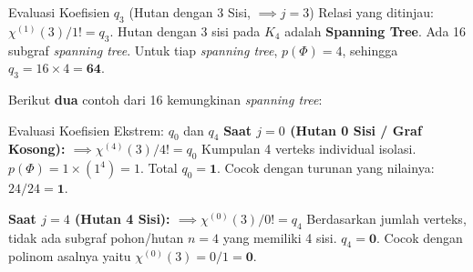 ﻿\documentclass[aspectratio=169]{beamer}
\begin{document}
\begin{frame}[fragile]{Evaluasi Koefisien $q_3$ (Hutan dengan 3 Sisi, $\implies j = 3$)}
  Relasi yang ditinjau: $\chi^{(1)}(3) / 1! = q_3$.
  Hutan dengan 3 sisi pada $K_4$ adalah \textbf{Spanning Tree}. Ada 16 subgraf \textit{spanning tree}.
  Untuk tiap \textit{spanning tree}, $p(\Phi) = 4$, sehingga $q_3 = 16 \times 4 = \mathbf{64}$.

  Berikut \textbf{dua} contoh dari 16 kemungkinan \textit{spanning tree}:

  \vspace{0.4cm}
  \begin{center}
  \end{center}
\end{frame}

\begin{frame}[fragile]{Evaluasi Koefisien Ekstrem: $q_0$ dan $q_4$}
  \textbf{Saat $j=0$ (Hutan 0 Sisi / Graf Kosong): $\implies \chi^{(4)}(3) / 4! = q_0$}
  Kumpulan 4 verteks individual isolasi.  $p(\Phi) = 1 \times (1^4) = 1$. Total $q_0 = \mathbf{1}$.
  Cocok dengan turunan yang nilainya: $24 / 24 = \mathbf{1}$.

  \vspace{0.4cm}
  \textbf{Saat $j=4$ (Hutan 4 Sisi): $\implies \chi^{(0)}(3) / 0! = q_4$}
  Berdasarkan jumlah verteks, tidak ada subgraf pohon/hutan $n=4$ yang memiliki 4 sisi. $q_4 = \mathbf{0}$.
  Cocok dengan polinom asalnya yaitu $\chi^{(0)}(3) = 0 / 1 = \mathbf{0}$.

\end{frame}
\end{document}
